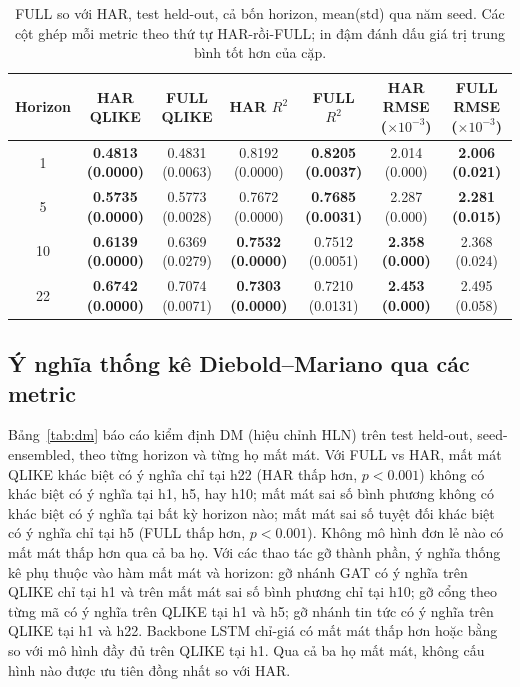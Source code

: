 \documentclass[runningheads]{llncs}
\begin{document}
\begin{table}[t]
\caption{FULL so với HAR, test held-out, cả bốn horizon, mean(std) qua năm seed. Các cột ghép mỗi metric
theo thứ tự HAR-rồi-FULL; in đậm đánh dấu giá trị trung bình tốt hơn của cặp.}
\label{tab:fullvshar}
\centering
\begin{tabular}{ccccccc}
\toprule
Horizon & HAR QLIKE & FULL QLIKE & HAR $R^2$ & FULL $R^2$ & HAR RMSE ($\times10^{-3}$) & FULL RMSE ($\times10^{-3}$) \\
\midrule
1  & \textbf{0.4813 (0.0000)} & 0.4831 (0.0063) & 0.8192 (0.0000) & \textbf{0.8205 (0.0037)} & 2.014 (0.000) & \textbf{2.006 (0.021)} \\
5  & \textbf{0.5735 (0.0000)} & 0.5773 (0.0028) & 0.7672 (0.0000) & \textbf{0.7685 (0.0031)} & 2.287 (0.000) & \textbf{2.281 (0.015)} \\
10 & \textbf{0.6139 (0.0000)} & 0.6369 (0.0279) & \textbf{0.7532 (0.0000)} & 0.7512 (0.0051) & \textbf{2.358 (0.000)} & 2.368 (0.024) \\
22 & \textbf{0.6742 (0.0000)} & 0.7074 (0.0071) & \textbf{0.7303 (0.0000)} & 0.7210 (0.0131) & \textbf{2.453 (0.000)} & 2.495 (0.058) \\
\bottomrule
\end{tabular}
\end{table}

\subsection{Ý nghĩa thống kê Diebold--Mariano qua các metric}
\label{sec:dm}
Bảng~\ref{tab:dm} báo cáo kiểm định DM (hiệu chỉnh HLN) trên test held-out, seed-ensembled, theo từng
horizon và từng họ mất mát. Với FULL vs HAR, mất mát QLIKE khác biệt có ý nghĩa chỉ tại h22 (HAR thấp
hơn, $p<0.001$) không có khác biệt có ý nghĩa tại h1, h5, hay h10; mất mát sai số bình phương không có
khác biệt có ý nghĩa tại bất kỳ horizon nào; mất mát sai số tuyệt đối khác biệt có ý nghĩa chỉ tại h5
(FULL thấp hơn, $p<0.001$). Không mô hình đơn lẻ nào có mất mát thấp hơn qua cả ba họ. Với các thao tác
gỡ thành phần, ý nghĩa thống kê phụ thuộc vào hàm mất mát và horizon: gỡ nhánh GAT có ý nghĩa trên QLIKE
chỉ tại h1 và trên mất mát sai số bình phương chỉ tại h10; gỡ cổng theo từng mã có ý nghĩa trên QLIKE tại
h1 và h5; gỡ nhánh tin tức có ý nghĩa trên QLIKE tại h1 và h22. Backbone LSTM chỉ-giá có mất mát thấp hơn
hoặc bằng so với mô hình đầy đủ trên QLIKE tại h1. Qua cả ba họ mất mát, không cấu hình nào được ưu tiên
đồng nhất so với HAR.
\end{document}
